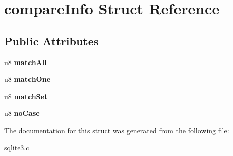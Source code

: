 \hypertarget{structcompare_info}{\section{compare\-Info Struct Reference}
\label{structcompare_info}
}
\subsection*{Public Attributes}
\begin{DoxyCompactItemize}
\item 
\hypertarget{structcompare_info_a1161e850029ef556e6daee856d32b2e2}{u8 {\bfseries match\-All}}\label{structcompare_info_a1161e850029ef556e6daee856d32b2e2}

\item 
\hypertarget{structcompare_info_ab9aabbf6d3df26bad786b532330a2fd7}{u8 {\bfseries match\-One}}\label{structcompare_info_ab9aabbf6d3df26bad786b532330a2fd7}

\item 
\hypertarget{structcompare_info_a5d2ff58a72c9eb7d22f18915c1751655}{u8 {\bfseries match\-Set}}\label{structcompare_info_a5d2ff58a72c9eb7d22f18915c1751655}

\item 
\hypertarget{structcompare_info_a6de76861b066547321f7a255cb7042ab}{u8 {\bfseries no\-Case}}\label{structcompare_info_a6de76861b066547321f7a255cb7042ab}

\end{DoxyCompactItemize}


The documentation for this struct was generated from the following file\-:\begin{DoxyCompactItemize}
\item 
sqlite3.\-c\end{DoxyCompactItemize}
